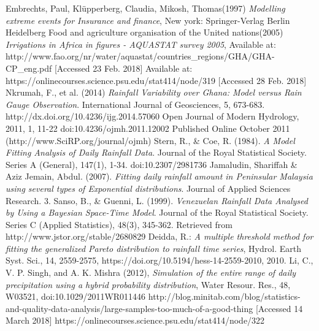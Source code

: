 \documentclass{article}
\begin{document}
\begin{thebibliography}{1}
	Embrechts, Paul, Kl\"{u}pperberg, Claudia, Mikosh, Thomas(1997)
	\textit{Modelling extreme events for Insurance and finance},
	New york: Springer-Verlag Berlin Heidelberg
	Food and agriculture organisation of the United nations(2005) \textit{Irrigations in Africa in figures - AQUASTAT survey 2005}, Available at: http://www.fao.org/nr/water/aquastat/countries\_regions/GHA/GHA-CP\_eng.pdf [Accessed 23 Feb. 2018]
	Available at:
	https://onlinecourses.science.psu.edu/stat414/node/319 [Accessed 28 Feb. 2018]
	Nkrumah, F., et al. (2014)\textit{ Rainfall Variability over Ghana: Model versus Rain Gauge Observation}. International Journal of Geosciences, 5, 673-683. http://dx.doi.org/10.4236/ijg.2014.57060
	Open Journal of Modern Hydrology, 2011, 1, 11-22
	doi:10.4236/ojmh.2011.12002 Published Online October 2011 (http://www.SciRP.org/journal/ojmh)
	Stern, R., \& Coe, R. (1984). \textit{A Model Fitting Analysis of Daily Rainfall Data}. Journal of the Royal Statistical Society. Series A (General), 147(1), 1-34. doi:10.2307/2981736
	Jamaludin, Shariffah \& Aziz Jemain, Abdul. (2007).\textit{ Fitting daily rainfall amount in Peninsular Malaysia using several types of Exponential distributions}. Journal of Applied Sciences Research. 3. 
	Sanso, B., \& Guenni, L. (1999). \textit{Venezuelan Rainfall Data Analysed by Using a Bayesian Space-Time Model}. Journal of the Royal Statistical Society. Series C (Applied Statistics), 48(3), 345-362. Retrieved from http://www.jstor.org/stable/2680829
	Deidda, R.: \textit{A multiple threshold method for fitting the generalized Pareto distribution to rainfall time series}, Hydrol. Earth Syst. Sci., 14, 2559-2575, https://doi.org/10.5194/hess-14-2559-2010, 2010.
	Li, C., V. P. Singh, and A. K. Mishra (2012), \textit{Simulation of the entire range of daily precipitation using a hybrid probability distribution}, Water Resour. Res., 48, W03521, doi:10.1029/2011WR011446
	http://blog.minitab.com/blog/statistics-and-quality-data-analysis/large-samples-too-much-of-a-good-thing [Accessed 14 March 2018]
	https://onlinecourses.science.psu.edu/stat414/node/322
	
\end{thebibliography}
\end{document}

